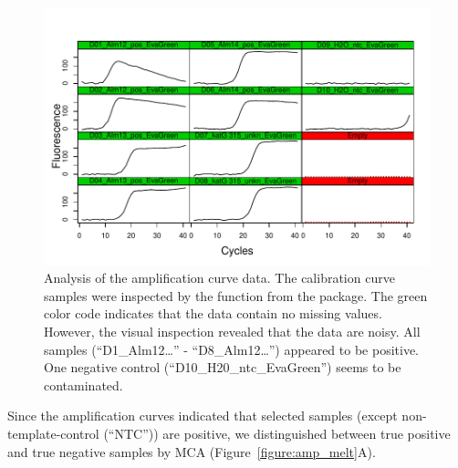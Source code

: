 \begin{figure}[htbp]
  \centering
  \includegraphics[clip=true, trim=0.2cm 0.3cm 0.4cm 1.2cm, width=12cm]{figures/plotCurves.pdf}
  \caption{Analysis of the amplification curve data. The calibration curve 
samples were inspected by the  function from the 
 package. The green color code indicates that the data contain 
no missing values. However, the visual inspection revealed that the data are 
noisy. All samples (``D1\_Alm12\ldots'' - ``D8\_Alm12\ldots'') appeared to be 
positive. One negative control (``D10\_H20\_ntc\_EvaGreen'') 
seems to be contaminated.}
  \label{figure:plotCurves}
\end{figure}

Since the amplification curves indicated that selected samples (except 
non-template-control (``NTC'')) are positive, we distinguished between true 
positive and true negative samples by MCA (Figure~\ref{figure:amp_melt}A).

